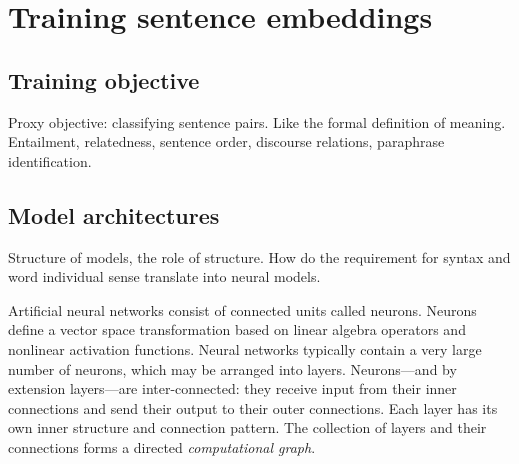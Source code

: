 \setchapterpreamble[u]{\margintoc}
\chapter{Training sentence embeddings}


\section{Training objective}

Proxy objective: classifying sentence pairs. Like the formal definition of meaning. Entailment, relatedness, sentence order, discourse relations, paraphrase identification. 

\section{Model architectures}

Structure of models, the role of structure. How do the requirement for syntax and word individual sense translate into neural models.

Artificial neural networks consist of connected units called neurons. Neurons define a vector space transformation based on linear algebra operators and nonlinear activation functions. Neural networks typically contain a very large number of neurons, which may be arranged into layers. Neurons—and by extension layers—are inter-connected: they receive input from their inner connections and send their output to their outer connections. Each layer has its own inner structure and connection pattern. The collection of layers and their connections forms a directed \textit{computational graph}. 